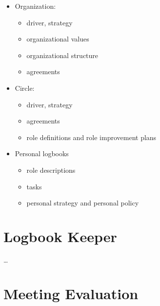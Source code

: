\begin{itemize}
\item Organization:

\begin{itemize}
\item driver, strategy

\item organizational values

\item organizational structure

\item agreements

\end{itemize}

\item Circle:

\begin{itemize}
\item driver, strategy

\item agreements

\item role definitions and role improvement plans

\end{itemize}

\item Personal logbooks

\begin{itemize}
\item role descriptions

\item tasks

\item personal strategy and personal policy

\end{itemize}

\end{itemize}

\section{Logbook Keeper}
\label{logbookkeeper}

{\ldots}

\section{Meeting Evaluation}
\label{meetingevaluation}

